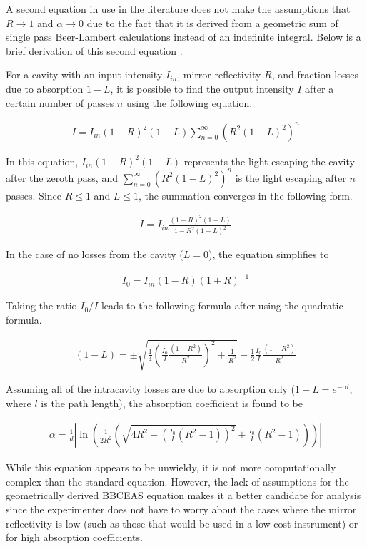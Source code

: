 A second equation in use in the literature does not make the assumptions
that $R \to 1$ and $\alpha \to 0$ due to the fact that it is derived from
a geometric sum of single pass Beer-Lambert calculations instead of an
indefinite integral. Below is a brief derivation of this
second equation \cite{Fiedler:2003db}.

For a cavity with an input intensity $I_{in}$, mirror reflectivity $R$,
and fraction losses due to absorption $1-L$, it is possible to find the
output intensity $I$ after a certain number of passes $n$ using the following
equation.

\begin{align*}
  I = I_{in}(1-R)^2(1-L)\sum_{n=0}^{\infty}(R^{2}(1-L)^{2})^{n}
\end{align*}

In this equation, $I_{in}(1-R)^2(1-L)$ represents the light escaping the
cavity after the zeroth pass, and $\sum_{n=0}^{\infty}(R^{2}(1-L)^{2})^{n}$ is
the light escaping after $n$ passes. Since $R \leq 1$ and $L \leq 1$, the
summation converges in the following form.

\begin{align*}
  I = I_{in}\frac{(1-R)^2(1-L)}{1-R^2(1-L)^2}
\end{align*}

In the case of no losses from the cavity ($L=0$), the equation simplifies to

\begin{align*}
  I_0 = I_{in}(1-R)(1+R)^{-1}
\end{align*}

Taking the ratio $I_0/I$ leads to the following formula after using the quadratic formula.

\begin{align*}
  (1-L) = \pm\sqrt{\frac{1}{4}\left(\frac{I_0}{I}\frac{(1-R^2)}{R^2}\right)^2+\frac{1}{R^2}} - \frac{1}{2}\frac{I_0}{I}\frac{(1-R^2)}{R^2}
\end{align*}

Assuming all of the intracavity losses are due to absorption only ($1-L =
e^{-\alpha l}$, where $l$ is the path length), the absorption coefficient is
found to be

  \begin{align}
    \alpha = \frac{1}{d}\left|\ln\left(\frac{1}{2R^2}\left(\sqrt{4R^2+\left(\frac{I_0}{I}(R^2-1)\right)^2} + \frac{I_0}{I}(R^2-1)\right)\right)\right| \label{eq:ceas_geo}
  \end{align}

While this equation appears to be unwieldy, it is not more computationally
complex than the standard equation. However, the lack of assumptions for the
geometrically derived \ac{BBCEAS} equation makes it a better candidate for
analysis since the experimenter does not have to worry about the cases where
the mirror reflectivity is low (such as those that would be used in a low cost
instrument) or for high absorption coefficients.

